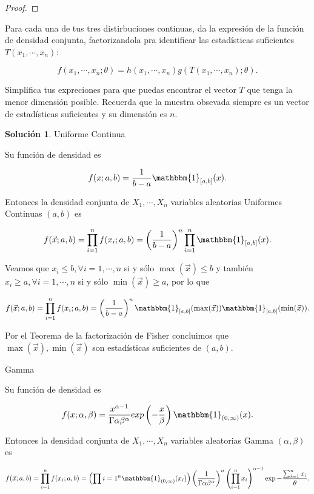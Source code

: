 \documentclass[letterpaper]{article}
\theoremstyle{definition}
\theoremstyle{lemathm}
\theoremstyle{lemathm}
\newtheorem{sol}{Solución}
\theoremstyle{lemathm}
\theoremstyle{lemademthm}
\newcommand{\pars}[1]{\left( #1 \right) }
\newcommand{\bracs}[1]{\left[ #1 \right] }
\newcommand{\1}{\mathbbm{1}}
\begin{document}
\begin{enumerate}
\begin{proof}
		\end{proof}

		\item Para cada una de tus tres distirbuciones continuas, da la expresión de la función de densidad conjunta, factorizandola pra identificar las estadísticas suficientes $T(x_1,\cdots,x_n)$:
		
		\[f\pars{x_1,\cdots,x_n;\theta} = h\pars{x_1,\cdots,x_n}g\pars{T\pars{x_1,\cdots,x_n};\theta}.\]

		Simplifica tus expreciones para que puedas encontrar el vector $T$ que tenga la menor dimensión posible. Recuerda que la muestra obsevada siempre es un vector de estadísticas suficientes y su dimensión es $n$.

		\begin{sol}
			\item Uniforme Continua
			
			Su función de densidad es

			\[f(x; a,b) = \frac{1}{b-a} \1_{\bracs{a,b}}(x).\]

			Entonces la densidad conjunta de $X_1,\cdots,X_n$ variables aleatorias Uniformes Continuas $(a,b)$ es

			\[f(\vec{x}; a,b) = \prod_{i=1}^n f(x_i;a,b) = \pars{\frac{1}{b-a}}^n \prod_{i=1}^n \1_{\bracs{a,b}}(x).\]

			Veamos que $x_i \leq b, \forall i=1,\cdots,n$ si y sólo $\max(\vec{x}) \leq b$ y también $x_i \geq a, \forall i=1,\cdots,n$ si y sólo $\min(\vec{x}) \geq a$, por lo que

			\[f(\vec{x}; a,b) = \prod_{i=1}^n f(x_i;a,b) = \pars{\frac{1}{b-a}}^n \1_{\bracs{a,b}}(\max(\vec{x}))\1_{\bracs{a,b}}(\min(\vec{x})).\]

			Por el Teorema de la factorización de Fisher concluimos que $\max(\vec{x}),\min(\vec{x})$ son estadísticas suficientes de $\pars{a,b}$.

			\item Gamma
			
			Su función de densidad es

			\[f(x;\alpha,\beta) = \frac{x^{\alpha-1}}{\Gamma{\alpha}\beta^{\alpha}} exp\pars{-\frac{x}{\beta}} \1_{(0,\infty)}(x).\]

			Entonces la densidad conjunta de $X_1,\cdots,X_n$ variables aleatorias Gamma $(\alpha,\beta)$ es

			\[f(\vec{x}; a,b) = \prod_{i=1}^n f(x_i;a,b) = \pars{\prod{i=1}^{n}\1_{(0,\infty)}(x_i)} \pars{\frac{1}{\Gamma{\alpha}\beta^{\alpha}}}^n \pars{\prod_{i=1}^n x_i}^{\alpha-1} \exp{-\frac{\sum_{i=1}^n x_i}{\theta}}.\]


\end{sol}
\end{enumerate}
\end{document}
